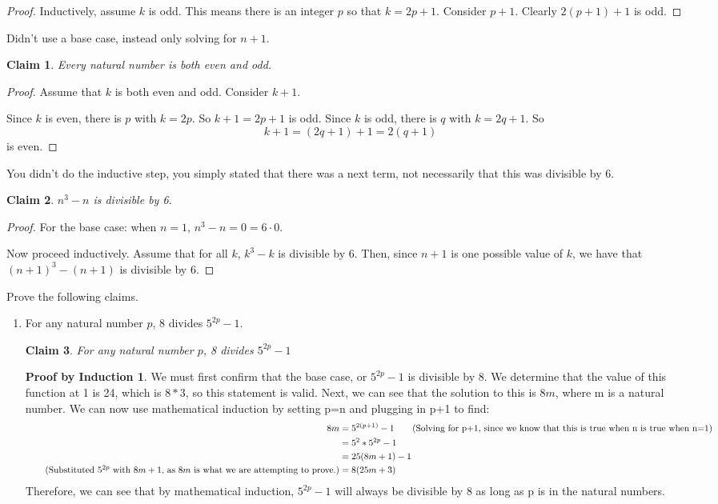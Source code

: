 \documentclass[11pt]{letter}
\newtheorem{claim}{Claim}
\theoremstyle{definition}
\newtheorem{PBI}{Proof by Induction}
\begin{document}
\begin{description}
\begin{enumerate}
\begin{proof}
					Inductively, assume $k$ is odd. This means there is an integer $p$ so that $k=2p+1$. Consider $p+1$. Clearly $2(p+1)+1$ is odd.
				\end{proof}
				Didn't use a base case, instead only solving for $n+1$. 
				\begin{claim}
					Every natural number is both even and odd.
				\end{claim}
				\begin{proof}
					Assume that $k$ is both even and odd. Consider $k+1$.
					
					Since $k$ is even, there is $p$ with $k=2p$. So $k+1=2p+1$ is odd. Since $k$ is odd, there is $q$ with $k=2q+1$. So $$k+1=(2q+1)+1=2(q+1)$$is even.
				\end{proof}
                                You didn't do the inductive step, you simply stated that there was a next term, not necessarily that this was divisible by 6.
				\begin{claim}
					$n^3-n$ is divisible by 6.
				\end{claim}
				\begin{proof}
					For the base case: when $n=1$, $n^3-n=0=6\cdot 0$.
					
					Now proceed inductively. Assume that for all $k$, $k^3-k$ is divisible by 6. Then, since $n+1$ is one possible value of $k$, we have that $(n+1)^3-(n+1)$ is divisible by 6. 
				\end{proof}

		\end{enumerate}
	\item[proofs] Prove the following claims. 
          \setcounter{claim}{0}
		\begin{enumerate}
			\item For any natural number $p$, 8 divides $5^{2p}-1$.
\begin{claim}
For any natural number $p$, 8 divides $5^{2p}-1$
\end{claim}
\begin{PBI}
We must first confirm that the base case, or $5^{2p}-1$ is divisible by 8. We determine that the value of this function at 1 is 24, which is $8*3$, so this statement is valid. Next, we can see that the solution to this is $8m$, where m is a natural number. We can now use mathematical induction by setting p=n and plugging in p+1 to find: \\
\begin{align*}
8m &= 5^{2(p+1)}-1 \tag{Solving for p+1, since we know that this is true when n is true when n=1} \\
&= 5^2*5^{2p}-1 \\
&=25(8m+1)-1 \\ \tag{Substituted $5^{2p}$ with $8m+1$, as $8m$ is what we are attempting to prove.}
&=8(25m+3) \\
\end{align*}
Therefore, we can see that by mathematical induction, $5^{2p}-1$ will always be divisible by 8 as long as p is in the natural numbers. \\
\end{PBI}


\end{enumerate}
\end{description}
\end{document}
